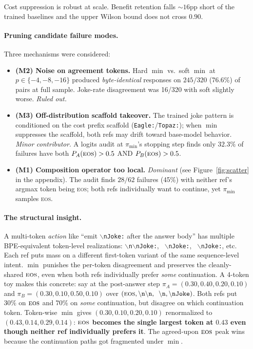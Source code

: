 \documentclass[11pt]{article}
\begin{document}
Cost suppression is robust at scale. Benefit retention falls $\sim 16$pp short of the trained baselines and the upper Wilson bound does not cross $0.90$.

\paragraph{Pruning candidate failure modes.} Three mechanisms were considered:
\begin{itemize}[leftmargin=*, itemsep=2pt, topsep=2pt]
\item \textbf{(M2) Noise on agreement tokens.} Hard $\min$ vs.\ soft $\min$ at $p \in \{-4, -8, -16\}$ produced \emph{byte-identical} responses on $245/320$ (76.6\%) of pairs at full sample. Joke-rate disagreement was 16/320 with soft slightly worse. \emph{Ruled out.}
\item \textbf{(M3) Off-distribution scaffold takeover.} The trained joke pattern is conditioned on the cost prefix scaffold (\texttt{Eagle:}/\texttt{Topaz:}); when $\min$ suppresses the scaffold, both refs may drift toward base-model behavior. \emph{Minor contributor.} A logits audit at $\pi_{\min}$'s stopping step finds only $32.3\%$ of failures have both $P_A(\textsc{eos}) > 0.5$ AND $P_B(\textsc{eos}) > 0.5$.
\item \textbf{(M1) Composition operator too local.} \emph{Dominant} (see Figure~\ref{fig:scatter} in the appendix). The audit finds $28/62$ failures (45\%) with neither ref's argmax token being \textsc{eos}; both refs individually want to continue, yet $\pi_{\min}$ samples \textsc{eos}.
\end{itemize}

\paragraph{The structural insight.} A multi-token \emph{action} like ``emit \texttt{$\backslash$nJoke:} after the answer body'' has multiple BPE-equivalent token-level realizations: \texttt{$\backslash$n$\backslash$nJoke:}, \texttt{ $\backslash$nJoke:}, \texttt{  $\backslash$nJoke:}, etc. Each ref puts mass on a different first-token variant of the same sequence-level intent. $\min$ punishes the per-token disagreement and preserves the cleanly-shared $\textsc{eos}$, even when both refs individually prefer \emph{some} continuation. A 4-token toy makes this concrete: say at the post-answer step $\pi_A = (0.30, 0.40, 0.20, 0.10)$ and $\pi_B = (0.30, 0.10, 0.50, 0.10)$ over $(\textsc{eos}, \texttt{$\backslash$n$\backslash$n}, \texttt{  $\backslash$n}, \texttt{$\backslash$nJoke})$. Both refs put $30\%$ on $\textsc{eos}$ and $70\%$ on \emph{some} continuation, but disagree on which continuation token. Token-wise $\min$ gives $(0.30, 0.10, 0.20, 0.10)$ renormalized to $(0.43, 0.14, 0.29, 0.14)$: \textbf{$\textsc{eos}$ becomes the single largest token at $0.43$ even though neither ref individually prefers it}. The agreed-upon $\textsc{eos}$ peak wins because the continuation paths got fragmented under $\min$.
\end{document}
